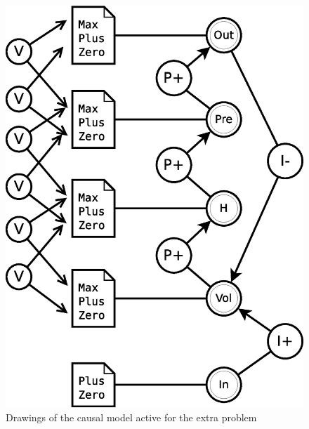 \documentclass[a4paper]{article}
\begin{document}
\begin{figure}[H]
\centering
\includegraphics[scale=0.4]{problem_extra.eps}
\caption{Drawings of the causal model active for the extra problem}
\end{figure}
\end{document}
